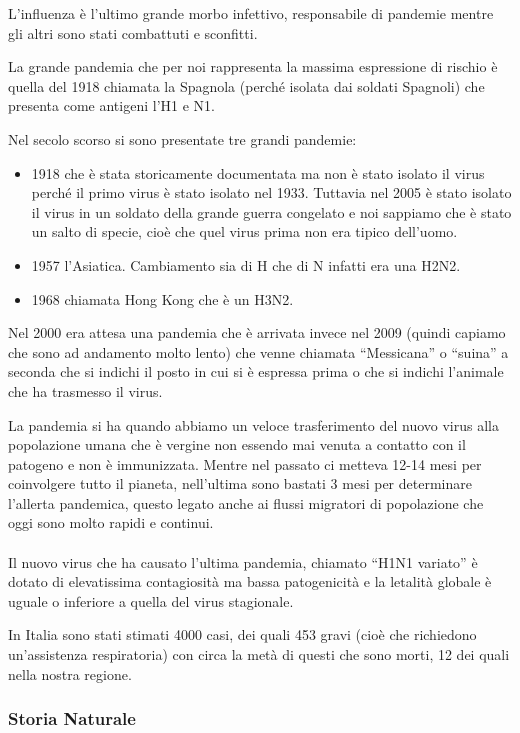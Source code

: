 L'influenza è l'ultimo grande morbo infettivo, responsabile di pandemie
mentre gli altri sono stati combattuti e sconfitti.

La grande pandemia che per noi rappresenta la massima espressione di
rischio è quella del 1918 chiamata la Spagnola (perché isolata dai
soldati Spagnoli) che presenta come antigeni l'H1 e N1.

Nel secolo scorso si sono presentate tre grandi pandemie:
\begin{itemize}
\item 
 1918 che è stata storicamente documentata ma non è stato isolato il
virus perché il primo virus è stato isolato nel 1933. Tuttavia nel 2005
è stato isolato il virus in un soldato della grande guerra congelato e
noi sappiamo che è stato un salto di specie, cioè che quel virus prima
non era tipico dell'uomo.
\item 
 1957 l'Asiatica. Cambiamento sia di H che di N infatti era una H2N2.
\item 
 1968 chiamata Hong Kong che è un H3N2.
\end{itemize}
Nel 2000 era attesa una pandemia che è arrivata invece nel 2009 (quindi
capiamo che sono ad andamento molto lento) che venne chiamata
``Messicana'' o ``suina'' a seconda che si indichi il posto in cui si è
espressa prima o che si indichi l'animale che ha trasmesso il virus.

La pandemia si ha quando abbiamo un veloce trasferimento del nuovo virus
alla popolazione umana che è vergine non essendo mai venuta a contatto
con il patogeno e non è immunizzata. Mentre nel passato ci metteva 12-14
mesi per coinvolgere tutto il pianeta, nell'ultima sono bastati 3 mesi
per determinare l'allerta pandemica, questo legato anche ai flussi
migratori di popolazione che oggi sono molto rapidi e continui.
\\\\
Il nuovo virus che ha causato l'ultima pandemia, chiamato ``H1N1
variato'' è dotato di elevatissima contagiosità ma bassa patogenicità e
la letalità globale è uguale o inferiore a quella del virus stagionale.

In Italia sono stati stimati 4000 casi, dei quali 453 gravi (cioè che
richiedono un'assistenza respiratoria) con circa la metà di questi che
sono morti, 12 dei quali nella nostra regione.

\subsubsection{Storia Naturale}


